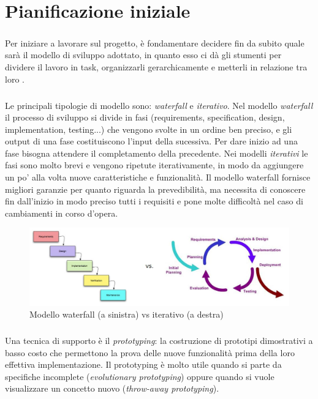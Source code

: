 \documentclass[12pt,a4paper,twoside,english,italian]{book}
\begin{document}
\chapter{Pianificazione iniziale}

\paragraph{} Per iniziare a lavorare sul progetto, è fondamentare decidere fin da subito quale sarà il modello di sviluppo adottato, in quanto esso ci dà gli stumenti per dividere il lavoro in task, organizzarli gerarchicamente e metterli in relazione tra loro  \cite{modelli_sviluppo, agile_manifesto}. 

\paragraph{} Le principali tipologie di modello sono: \emph{waterfall} e \emph{iterativo}. Nel modello \emph{waterfall} il processo di sviluppo si divide in fasi (requirements, specification, design, implementation, testing...) che vengono svolte in un ordine ben preciso, e gli output di una fase costituiscono l'input della sucessiva. Per dare inizio ad una fase bisogna attendere il completamento della precedente. Nei modelli \emph{iterativi} le fasi sono molto brevi e vengono ripetute iterativamente, in modo da aggiungere un po' alla volta nuove caratteristiche e funzionalità. Il modello waterfall fornisce migliori garanzie per quanto riguarda la prevedibilità, ma necessita di conoscere fin dall'inizio in modo preciso tutti i requisiti e pone molte difficoltà nel caso di cambiamenti in corso d'opera.

\begin{figure}[H]
    \centering
    \includegraphics[width=1.0\textwidth]{img/waterfall_vs_iterativo.jpeg}
    \caption{Modello waterfall (a sinistra) vs iterativo (a destra)}
\end{figure}

\paragraph{} Una tecnica di supporto è il \emph{prototyping}: la costruzione di prototipi dimostrativi a basso costo che permettono la prova delle nuove funzionalità prima della loro effettiva implementazione. Il prototyping è molto utile quando si parte da specifiche incomplete (\emph{evolutionary prototyping}) oppure quando si vuole visualizzare un concetto nuovo (\emph{throw-away prototyping}). 
\end{document}
